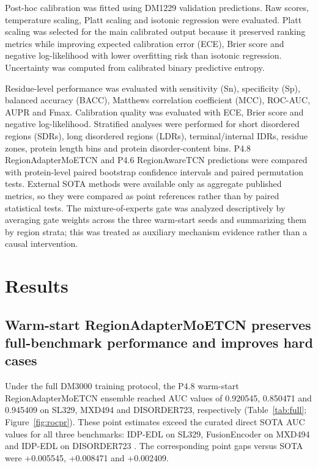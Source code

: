 \documentclass[namedate,webpdf,traditional,large]{oup-authoring-template}
\newcommand{\method}{RegionAdapterMoETCN}
\newcommand{\backbone}{RegionAwareTCN}
\begin{document}
Post-hoc calibration was fitted using DM1229 validation predictions. Raw scores, temperature scaling, Platt scaling and isotonic regression were evaluated. Platt scaling was selected for the main calibrated output because it preserved ranking metrics while improving expected calibration error (ECE), Brier score and negative log-likelihood with lower overfitting risk than isotonic regression. Uncertainty was computed from calibrated binary predictive entropy.

Residue-level performance was evaluated with sensitivity (Sn), specificity (Sp), balanced accuracy (BACC), Matthews correlation coefficient (MCC), ROC-AUC, AUPR and Fmax. Calibration quality was evaluated with ECE, Brier score and negative log-likelihood. Stratified analyses were performed for short disordered regions (SDRs), long disordered regions (LDRs), terminal/internal IDRs, residue zones, protein length bins and protein disorder-content bins. P4.8 \method{} and P4.6 \backbone{} predictions were compared with protein-level paired bootstrap confidence intervals and paired permutation tests. External SOTA methods were available only as aggregate published metrics, so they were compared as point references rather than by paired statistical tests. The mixture-of-experts gate was analyzed descriptively by averaging gate weights across the three warm-start seeds and summarizing them by region strata; this was treated as auxiliary mechanism evidence rather than a causal intervention.

\section{Results}

\subsection{Warm-start \method{} preserves full-benchmark performance and improves hard cases}

Under the full DM3000 training protocol, the P4.8 warm-start \method{} ensemble reached AUC values of 0.920545, 0.850471 and 0.945409 on SL329, MXD494 and DISORDER723, respectively (Table~\ref{tab:full}; Figure~\ref{fig:rocpr}). These point estimates exceed the curated direct SOTA AUC values for all three benchmarks: IDP-EDL on SL329, FusionEncoder on MXD494 and IDP-EDL on DISORDER723 \citep{xie2025idpedl,liu2025fusionencoder}. The corresponding point gaps versus SOTA were +0.005545, +0.008471 and +0.002409.
\end{document}
